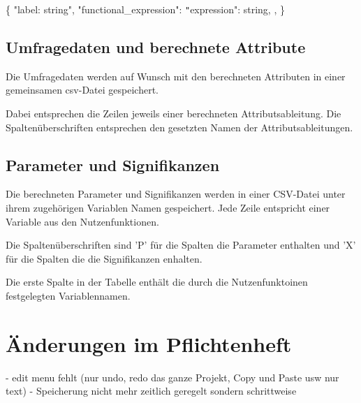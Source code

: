 \documentclass{article}
\begin{document}
\newline
\{ \newline
    "label: string", \newline
    "functional\_expression": {\newline
        \texttt{"}expression": string, \newline
    }, \newline
\} \newline
\newline


\subsection{Umfragedaten und berechnete Attribute}
Die Umfragedaten werden auf Wunsch mit den berechneten Attributen in einer gemeinsamen csv-Datei gespeichert. 

Dabei entsprechen die Zeilen jeweils einer berechneten Attributsableitung. Die Spaltenüberschriften entsprechen den gesetzten Namen der Attributsableitungen. 

\subsection{Parameter und Signifikanzen}
Die berechneten Parameter und Signifikanzen werden in einer CSV-Datei unter ihrem zugehörigen Variablen Namen gespeichert. Jede Zeile entspricht einer Variable aus den Nutzenfunktionen.

Die Spaltenüberschriften sind 'P' für die Spalten die Parameter enthalten und 'X' für die Spalten die die Signifikanzen enhalten. 

Die erste Spalte in der Tabelle enthält die durch die Nutzenfunktoinen festgelegten Variablennamen.


\section{Änderungen im Pflichtenheft}
- edit menu fehlt (nur undo, redo das ganze Projekt, Copy und Paste usw nur text)
- Speicherung nicht mehr zeitlich geregelt sondern schrittweise
\end{document}
